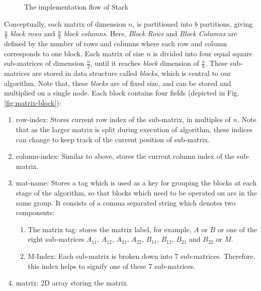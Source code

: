\begin{figure}
	\caption{The implementation flow of Stark}
	\label{fig:distributedStrassen}
\end{figure}

Conceptually, each matrix of dimension $n$, is partitioned into $b$ partitions, giving $\frac{n}{b}$ \textit{block rows} and $\frac{n}{b}$ \textit{block columns}. Here, \textit{Block Rows} and \textit{Block Columns} are defined by the number of rows and columns where each row and column corresponds to one block. Each matrix of size $n$ is divided into four equal square sub-matrices of dimension $\frac{n}{2}$, until it reaches \textit{block} dimension of $\frac{n}{b}$. These sub-matrices are stored in data structure called \textit{blocks}, which is central to our algorithm. Note that, these \textit{blocks} are of fixed size, and can be stored and multiplied on a single node. Each block contains four fields (depicted in Fig. \ref{fig:matrix-block}):

\begin{enumerate}
    \item row-index: Stores current row index of the sub-matrix, in multiples of $n$. Note that as the larger matrix is split during execution of algorithm, these indices can change to keep track of the current position of sub-matrix.
    \item column-index: Similar to above, stores the current column index of the sub-matrix.
    \item mat-name: Stores a tag which is used as a key for grouping the blocks at each stage of the algorithm, so that blocks which need to be operated on are in the same group. It consists of a comma separated string which denotes two components:
    \begin{enumerate}
        \item The matrix tag: stores the matrix label, for example, $A$ or $B$ or one of the eight sub-matrices $A_{11}$, $A_{12}$, $A_{21}$, $A_{22}$, $B_{11}$, $B_{12}$, $B_{21}$ and $B_{22}$ or $M$.
        \item M-Index: Each sub-matrix is broken down into $7$ sub-matrices. Therefore, this index helps to signify one of these $7$ sub-matrices.
    \end{enumerate}
    \item matrix: 2D array storing the matrix.
\end{enumerate}

